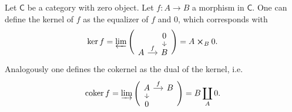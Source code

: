 \documentclass[../Main]{subfiles}
\begin{document}
\begin{defn}[(Co)kernel]
	Let $\mathsf{C}$ be a category with zero object.
	Let $f\colon A \to B$ a morphism in $\mathsf{C}$.
	One can define the kernel of $f$
	as the equalizer of $f$ and $0$, which corresponds with
	\begin{equation}
		\ker f = 
		\varprojlim \Bigg(
			\begin{tikzcd}[row sep=0.60em, column sep=1.2em]
			&
			0 \arrow[d, "", rightarrow] \\
			A \arrow[r, "f", rightarrow] &
			B
		\end{tikzcd} \Bigg)
		= A \cross_B 0
	.\end{equation} 
	Analogously one defines the cokernel as the dual of the kernel, i.e.
	\begin{equation}
	\mathrm{coker}\, f = 
		\varinjlim \Bigg(
			\begin{tikzcd}[row sep=0.60em, column sep=1.2em]
			A \arrow[r, "f", rightarrow] \arrow[d, "", rightarrow] &
			B \\
			0 &
		\end{tikzcd} \Bigg) =
	B \coprod_A 0
	.\end{equation} 
\end{defn}
\end{document}
